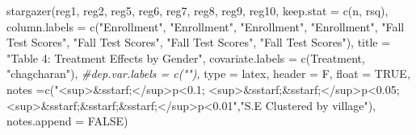 \documentclass[
]{article}
\newenvironment{Shaded}{\begin{snugshade}}{\end{snugshade}}
\newcommand{\AttributeTok}[1]{\textcolor[rgb]{0.77,0.63,0.00}{#1}}
\newcommand{\CommentTok}[1]{\textcolor[rgb]{0.56,0.35,0.01}{\textit{#1}}}
\newcommand{\ConstantTok}[1]{\textcolor[rgb]{0.00,0.00,0.00}{#1}}
\newcommand{\FunctionTok}[1]{\textcolor[rgb]{0.00,0.00,0.00}{#1}}
\newcommand{\NormalTok}[1]{#1}
\newcommand{\StringTok}[1]{\textcolor[rgb]{0.31,0.60,0.02}{#1}}
\begin{document}
\begin{Shaded}
\begin{Highlighting}[]
\FunctionTok{stargazer}\NormalTok{(reg1, reg2, reg5, reg6, reg7, reg8, reg9, reg10, }
          \AttributeTok{keep.stat =} \FunctionTok{c}\NormalTok{(}\StringTok{\textquotesingle{}n\textquotesingle{}}\NormalTok{, }\StringTok{\textquotesingle{}rsq\textquotesingle{}}\NormalTok{), }\AttributeTok{column.labels =} \FunctionTok{c}\NormalTok{(}\StringTok{"Enrollment"}\NormalTok{, }\StringTok{"Enrollment"}\NormalTok{, }\StringTok{"Enrollment"}\NormalTok{, }\StringTok{"Enrollment"}\NormalTok{, }\StringTok{"Fall Test Scores"}\NormalTok{, }\StringTok{"Fall Test Scores"}\NormalTok{, }\StringTok{"Fall Test Scores"}\NormalTok{, }\StringTok{"Fall Test Scores"}\NormalTok{),}
          \AttributeTok{title =} \StringTok{"Table 4: Treatment Effects by Gender"}\NormalTok{,}
          \AttributeTok{covariate.labels =} \FunctionTok{c}\NormalTok{(}\StringTok{\textquotesingle{}Treatment\textquotesingle{}}\NormalTok{, }\StringTok{"chagcharan"}\NormalTok{),}
          \CommentTok{\#dep.var.labels = c(""), }
          \AttributeTok{type =} \StringTok{\textquotesingle{}latex\textquotesingle{}}\NormalTok{, }\AttributeTok{header =}\NormalTok{ F, }\AttributeTok{float =} \ConstantTok{TRUE}\NormalTok{,}
          \AttributeTok{notes =}\FunctionTok{c}\NormalTok{(}\StringTok{"\textless{}sup\textgreater{}\&sstarf;\textless{}/sup\textgreater{}p\textless{}0.1; \textless{}sup\textgreater{}\&sstarf;\&sstarf;\textless{}/sup\textgreater{}p\textless{}0.05; \textless{}sup\textgreater{}\&sstarf;\&sstarf;\&sstarf;\textless{}/sup\textgreater{}p\textless{}0.01"}\NormalTok{,}\StringTok{"S.E Clustered by village"}\NormalTok{), }\AttributeTok{notes.append =} \ConstantTok{FALSE}\NormalTok{)}
\end{Highlighting}
\end{Shaded}
\end{document}
